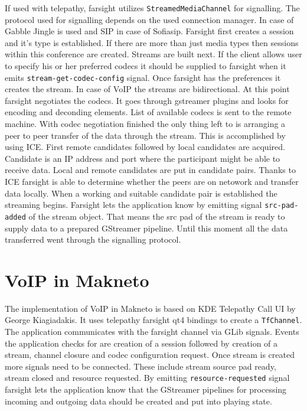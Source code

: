 If used with telepathy, farsight utilizes \verb|StreamedMediaChannel| for signalling. The protocol used for signalling depends on the used connection manager. In case of Gabble Jingle is used and SIP in case of Sofiasip. Farsight first creates a session and it's type is established. If there are more than just media types then sessions within this conference are created. Streams are built next. If the client allows user to specify his or her preferred codecs it should be supplied to farsight when it emits \verb|stream-get-codec-config| signal. Once farsight has the preferences it creates the stream. In case of VoIP the streams are bidirectional. At this point farsight negotiates the codecs. It goes through gstreamer plugins and looks for encoding and deconding elements. List of available codecs is sent to the remote machine. With codec negotiation finished the only thing left to is arranging a peer to peer transfer of the data through the stream. This is accomplished by using ICE. First remote candidates followed by local candidates are acquired. Candidate is an IP address and port where the participant might be able to receive data. Local and remote candidates are put in candidate pairs. Thanks to ICE farsight is able to determine whether the peers are on netowork and transfer data locally. When a working and suitable candidate pair is established the streaming begins. Farsight lets the application know by emitting signal \verb|src-pad-added| of the stream object. That means the src pad of the stream is ready to supply data to a prepared GStreamer pipeline. Until this moment all the data transferred went through the signalling protocol. 


\section{VoIP in Makneto}
The implementation of VoIP in Makneto is based on KDE Telepathy Call UI \cite{kdeTpCallUI} by George Kiagiadakis. It uses telepathy farsight qt4 bindings to create a \verb|TfChannel|. The application communicates with the farsight channel via GLib signals. Events the application checks for are creation of a session followed by creation of a stream, channel closure and codec configuration request. Once stream is created more signals need to be connected. These include stream source pad ready, stream closed and resource requested. By emitting \verb|resource-requested| signal farsight lets the application know that the GStreamer pipelines for processing incoming and outgoing data should be created and put into playing state. 

